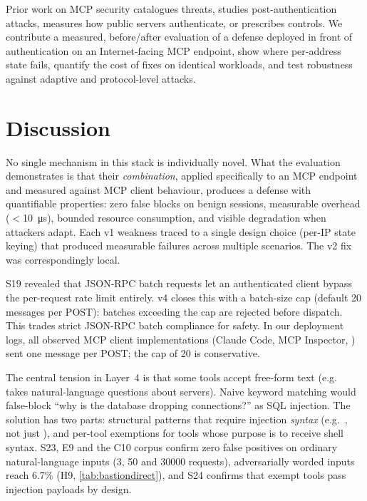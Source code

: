 \documentclass[10pt,twocolumn]{article}
\begin{document}
Prior work on MCP security catalogues threats, studies post-authentication
attacks, measures how public servers authenticate, or prescribes controls. We
contribute a measured, before/after evaluation of a defense deployed in front
of authentication on an Internet-facing MCP endpoint, show where per-address state fails, quantify
the cost of fixes on identical workloads, and test robustness against adaptive
and protocol-level attacks.

\section{Discussion}

No single mechanism in this stack is individually novel. What the evaluation
demonstrates is that their \emph{combination}, applied specifically to an MCP
endpoint and measured against MCP client behaviour, produces a defense with
quantifiable properties: zero false blocks on benign sessions, measurable
overhead ($<$\SI{10}{\micro\second}), bounded resource consumption, and
visible degradation when attackers adapt. Each v1 weakness traced to a single
design choice (per-IP state keying) that produced measurable failures across
multiple scenarios. The v2 fix was correspondingly local.

S19 revealed that JSON-RPC batch requests let an authenticated client bypass
the per-request rate limit entirely. v4 \bastion{} closes this with a
batch-size cap (default 20 messages per POST): batches exceeding the cap
are rejected before dispatch. This trades strict JSON-RPC batch compliance
for safety. In our deployment logs, all observed MCP client implementations
(Claude Code, MCP Inspector, ) sent one message per
POST; the cap of 20 is conservative.

The central tension in Layer~4 is that some tools accept free-form text
(e.g.\  takes natural-language questions about servers).
Naive keyword matching would false-block ``why is the database dropping
connections?'' as SQL injection. The solution has two parts: structural
patterns that require injection \emph{syntax} (e.g.\ , not
just ), and per-tool exemptions for tools whose purpose is to
receive shell syntax. S23, E9 and the C10 corpus confirm zero false
positives on ordinary natural-language inputs (3, 50 and \num{30000}
requests), adversarially worded inputs reach 6.7\% (H9,
\cref{tab:bastiondirect}), and S24 confirms that exempt tools pass injection
payloads by design.
\end{document}
